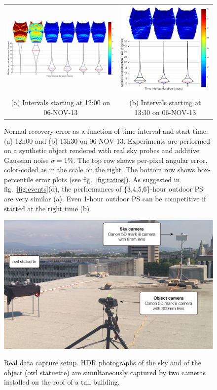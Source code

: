 \begin{figure}[t]
    \centering
    \footnotesize
    \begin{tabular}{cc}
        \includegraphics[height=4.7cm]{./figures/owl/owl-12h.pdf} & 
        \includegraphics[height=4.7cm]{./figures/owl/owl-13h30.pdf} \\
        (a) Intervals starting at 12:00 on 06-NOV-13 & (b) Intervals starting at 13:30 on 06-NOV-13
    \end{tabular}
    \vspace{1mm}
    \caption[Normal recovery error as a function of time interval and start time]{Normal recovery error as a function of time interval and start time: (a) 12h00 and (b) 13h30 on 06-NOV-13. Experiments are performed on a synthetic object rendered with real sky probes and additive Gaussian noise $\sigma=1\%$. The top row shows per-pixel angular error, color-coded as in the scale on the right. The bottom row shows box-percentile error plots (see fig.~\ref{fig:ratios}). As suggested in fig.~\ref{fig:events}(d), the performances of \{3,4,5,6\}-hour outdoor PS are very similar (a). Even 1-hour outdoor PS can be competitive if started at the right time (b).}
    \label{fig:owl-results}
    \vspace{-3mm}
\end{figure}

\begin{figure}[!t]
    \centering
    \includegraphics[width=.52\linewidth]{./figures/realData/realData-setup.pdf} \\[1mm]
    \caption[Real data capture setup]{Real data capture setup. HDR photographs of the sky and of the object (owl statuette) are simultaneously captured by two cameras installed on the roof of a tall building.}
    \label{fig:real-data-setup}
    \vspace{-2mm}
\end{figure}

